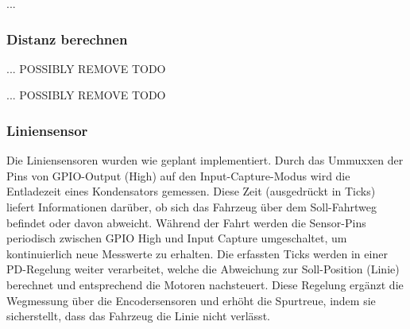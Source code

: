...

\subsubsection{Distanz berechnen}

... POSSIBLY REMOVE TODO



... POSSIBLY REMOVE TODO

\subsubsection{Liniensensor}

Die Liniensensoren wurden wie geplant implementiert. Durch das Ummuxxen der Pins von GPIO-Output (High) auf den Input-Capture-Modus wird die Entladezeit eines Kondensators gemessen. Diese Zeit (ausgedrückt in Ticks) liefert Informationen darüber, ob sich das Fahrzeug über dem Soll-Fahrtweg befindet oder davon abweicht. Während der Fahrt werden die Sensor-Pins periodisch zwischen GPIO High und Input Capture umgeschaltet, um kontinuierlich neue Messwerte zu erhalten. Die erfassten Ticks werden in einer PD-Regelung weiter verarbeitet, welche die Abweichung zur Soll-Position (Linie) berechnet und entsprechend die Motoren nachsteuert. Diese Regelung ergänzt die Wegmessung über die Encodersensoren und erhöht die Spurtreue, indem sie sicherstellt, dass das Fahrzeug die Linie nicht verlässt.